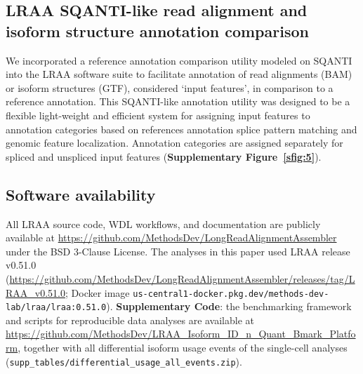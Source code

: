 \subsection{LRAA SQANTI-like read alignment and isoform structure annotation comparison}\label{lraa-sqanti-like-read-alignment-and-isoform-structure-annotation-comparison}

We incorporated a reference annotation comparison utility modeled on SQANTI \citep{pardopalacios2024} into the LRAA software suite to facilitate annotation of read alignments (BAM) or isoform structures (GTF), considered `input features', in comparison to a reference annotation. This SQANTI-like annotation utility was designed to be a flexible light-weight and efficient system for assigning input features to annotation categories based on references annotation splice pattern matching and genomic feature localization. Annotation categories are assigned separately for spliced and unspliced input features (\textbf{Supplementary Figure~\ref{sfig:5}}).

\subsection{Software availability}\label{software-availability}

All LRAA source code, WDL workflows, and documentation are publicly available at \url{https://github.com/MethodsDev/LongReadAlignmentAssembler} under the BSD 3-Clause License. The analyses in this paper used LRAA release v0.51.0 (\url{https://github.com/MethodsDev/LongReadAlignmentAssembler/releases/tag/LRAA_v0.51.0}; Docker image \texttt{us-central1-docker.pkg.dev/methods-dev-lab/lraa/lraa:0.51.0}). \textbf{Supplementary Code}: the benchmarking framework and scripts for reproducible data analyses are available at \url{https://github.com/MethodsDev/LRAA_Isoform_ID_n_Quant_Bmark_Platform}, together with all differential isoform usage events of the single-cell analyses (\texttt{supp\_tables/differential\_usage\_all\_events.zip}).
